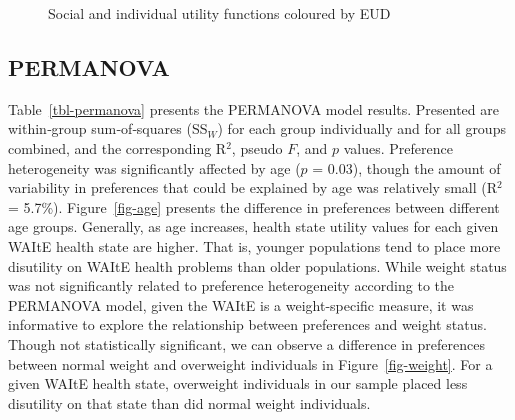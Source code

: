 \documentclass[
  number,
  preprint]{elsarticle}
\begin{document}
\begin{figure}


\caption{\label{fig-eud}Social and individual utility functions coloured
by EUD}

\end{figure}%

\subsection{PERMANOVA}\label{permanova}

Table~\ref{tbl-permanova} presents the PERMANOVA model results.
Presented are within‐group sum‐of‐squares (SS\(_W\)) for each group
individually and for all groups combined, and the corresponding R\(^2\),
pseudo \(F\), and \(p\) values. Preference heterogeneity was
significantly affected by age (\(p\) = 0.03), though the amount of
variability in preferences that could be explained by age was relatively
small (R\(^2\) = 5.7\%). Figure~\ref{fig-age} presents the difference in
preferences between different age groups. Generally, as age increases,
health state utility values for each given WAItE health state are
higher. That is, younger populations tend to place more disutility on
WAItE health problems than older populations. While weight status was
not significantly related to preference heterogeneity according to the
PERMANOVA model, given the WAItE is a weight-specific measure, it was
informative to explore the relationship between preferences and weight
status. Though not statistically significant, we can observe a
difference in preferences between normal weight and overweight
individuals in Figure~\ref{fig-weight}. For a given WAItE health state,
overweight individuals in our sample placed less disutility on that
state than did normal weight individuals.
\end{document}

